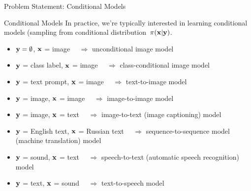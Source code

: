 \documentclass{beamer}
\begin{document}
\begin{frame}{Problem Statement: Conditional Models}
	\begin{block}{Conditional Models}
		In practice, we're typically interested in learning conditional models (sampling from conditional distribution~$\pi(\mathbf{x} | \mathbf{y})$. 
        \eqpause
		\begin{itemize}
			\item $\mathbf{y} = \emptyset$, $\mathbf{x}$ = image $\quad\Rightarrow$ unconditional image model
			\item $\mathbf{y}$ = class label, $\mathbf{x}$ = image $\quad\Rightarrow$ class-conditional image model
			\item $\mathbf{y}$ = text prompt, $\mathbf{x}$ = image $\quad\Rightarrow$ text-to-image model
			\item $\mathbf{y}$ = image, $\mathbf{x}$ = image $\quad\Rightarrow$ image-to-image model
			\item $\mathbf{y}$ = image, $\mathbf{x}$ = text $\quad\Rightarrow$ image-to-text (image captioning) model
			\item $\mathbf{y}$ = English text, $\mathbf{x}$ = Russian text $\quad\Rightarrow$ sequence-to-sequence model (machine translation) model
			\item $\mathbf{y}$ = sound, $\mathbf{x}$ = text $\quad\Rightarrow$ speech-to-text (automatic speech recognition) model
			\item $\mathbf{y}$ = text, $\mathbf{x}$ = sound $\quad\Rightarrow$ text-to-speech model
		\end{itemize}
	\end{block}
\end{frame}
\end{document}
